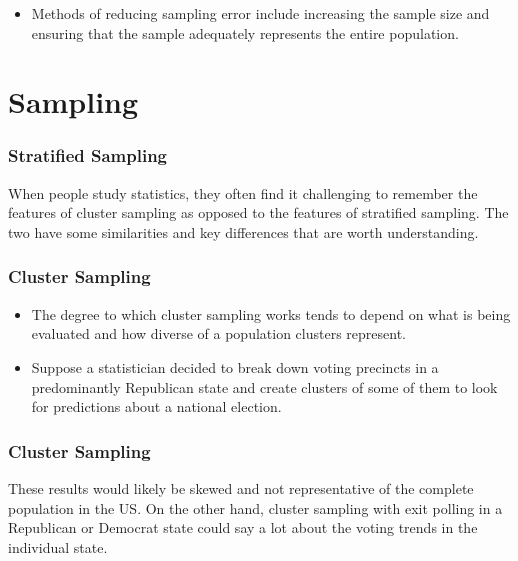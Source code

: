 ﻿\documentclass[]{report}
\begin{document}
\begin{itemize}
\item Methods of reducing sampling error include increasing the sample size and ensuring that the sample adequately represents the entire population.
\end{itemize}


\newpage
\chapter{Sampling}


\subsection{Stratified Sampling}

When people study statistics, they often find it challenging to remember the features of cluster sampling as opposed to the features of stratified sampling. The two have some similarities and key differences that are worth understanding. 




\subsection{Cluster Sampling}

\begin{itemize}
\item The degree to which cluster sampling works tends to depend on what is being evaluated and how diverse of a population clusters represent.
\item  Suppose a statistician decided to break down voting precincts in a predominantly Republican state and create clusters of some of them to look for predictions about a national election.
\end{itemize}


\subsection{Cluster Sampling}

These results would likely be skewed and not representative of the complete population in the US. On the other hand, cluster sampling with exit polling in a Republican or Democrat state could say a lot about the voting trends in the individual state. 
\end{document}
